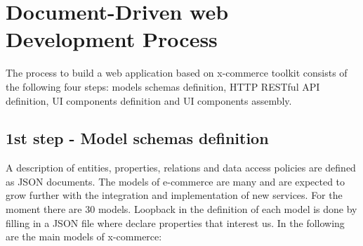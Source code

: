 \section{Document-Driven web Development Process}
\label{sec:document_driven_web_development_process}
The process to build a web application based on x-commerce toolkit consists of the following four steps: models schemas definition, HTTP RESTful API definition, UI components definition and UI components assembly.
\subsection{1st step - Model schemas definition}
A description of entities, properties, relations and data access policies are defined as JSON documents.
\newline
The models of e-commerce are many and are expected to grow further with the integration and implementation of new services. For the moment there are 30 models. Loopback in the definition of each model is done by filling in a JSON file where declare properties that interest us. In the following are the main models of x-commerce:
